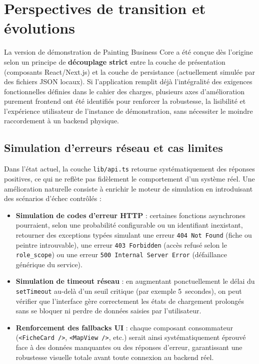 \documentclass[12pt,a4paper]{report}
\begin{document}
\newpage
\section{Perspectives de transition et évolutions}

La version de démonstration de Painting Business Core a été conçue dès l'origine selon un principe de \textbf{découplage strict} entre la couche de présentation (composants React/Next.js) et la couche de persistance (actuellement simulée par des fichiers JSON locaux). Si l'application remplit déjà l'intégralité des exigences fonctionnelles définies dans le cahier des charges, plusieurs axes d'amélioration purement frontend ont été identifiés pour renforcer la robustesse, la lisibilité et l'expérience utilisateur de l'instance de démonstration, sans nécessiter le moindre raccordement à un backend physique.

\subsection{Simulation d'erreurs réseau et cas limites}

Dans l'état actuel, la couche \texttt{lib/api.ts} retourne systématiquement des réponses positives, ce qui ne reflète pas fidèlement le comportement d'un système réel. Une amélioration naturelle consiste à enrichir le moteur de simulation en introduisant des scénarios d'échec contrôlés :

\begin{itemize}
    \item \textbf{Simulation de codes d'erreur HTTP} : certaines fonctions asynchrones pourraient, selon une probabilité configurable ou un identifiant inexistant, retourner des exceptions typées simulant une erreur \texttt{404 Not Found} (fiche ou peintre introuvable), une erreur \texttt{403 Forbidden} (accès refusé selon le \texttt{role\_scope}) ou une erreur \texttt{500 Internal Server Error} (défaillance générique du service).
    
    \item \textbf{Simulation de timeout réseau} : en augmentant ponctuellement le délai du \texttt{setTimeout} au-delà d'un seuil critique (par exemple 5~secondes), on peut vérifier que l'interface gère correctement les états de chargement prolongés sans se bloquer ni perdre de données saisies par l'utilisateur.
    
    \item \textbf{Renforcement des fallbacks UI} : chaque composant consommateur (\texttt{<FicheCard />}, \texttt{<MapView />}, etc.) serait ainsi systématiquement éprouvé face à des données manquantes ou des réponses d'erreur, garantissant une robustesse visuelle totale avant toute connexion au backend réel.
\end{itemize}
\end{document}
